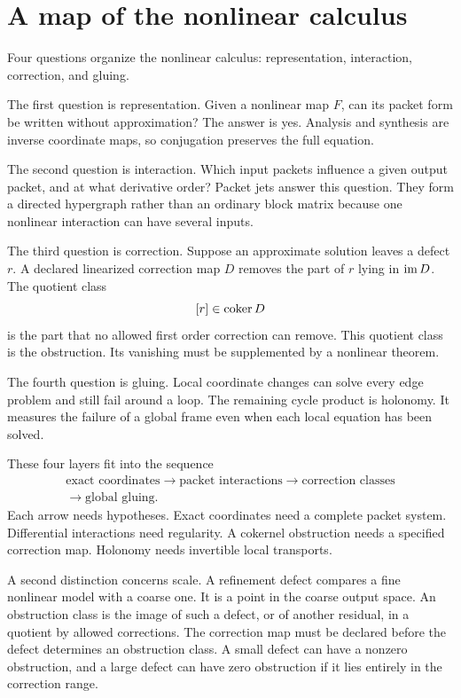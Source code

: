 \section{A map of the nonlinear calculus}\label{sec:map}

Four questions organize the nonlinear calculus: representation, interaction, correction, and gluing.

The first question is representation.  Given a nonlinear map $F$, can its packet form be written without approximation?  The answer is yes.  Analysis and synthesis are inverse coordinate maps, so conjugation preserves the full equation.

The second question is interaction.  Which input packets influence a given output packet, and at what derivative order?  Packet jets answer this question.  They form a directed hypergraph rather than an ordinary block matrix because one nonlinear interaction can have several inputs.

The third question is correction.  Suppose an approximate solution leaves a defect $r$.  A declared linearized correction map $D$ removes the part of $r$ lying in $\operatorname{im} D$.  The quotient class
\[
[r]\in\operatorname{coker} D
\]
is the part that no allowed first order correction can remove.  This quotient class is the obstruction.  Its vanishing must be supplemented by a nonlinear theorem.

The fourth question is gluing.  Local coordinate changes can solve every edge problem and still fail around a loop.  The remaining cycle product is holonomy.  It measures the failure of a global frame even when each local equation has been solved.

These four layers fit into the sequence
\[
\begin{gathered}
\text{exact coordinates}
\longrightarrow
\text{packet interactions}
\longrightarrow
\text{correction classes}
\\
\longrightarrow
\text{global gluing}.
\end{gathered}
\]
Each arrow needs hypotheses.  Exact coordinates need a complete packet system.  Differential interactions need regularity.  A cokernel obstruction needs a specified correction map.  Holonomy needs invertible local transports.

A second distinction concerns scale.  A refinement defect compares a fine nonlinear model with a coarse one.  It is a point in the coarse output space.  An obstruction class is the image of such a defect, or of another residual, in a quotient by allowed corrections.  The correction map must be declared before the defect determines an obstruction class.  A small defect can have a nonzero obstruction, and a large defect can have zero obstruction if it lies entirely in the correction range.

